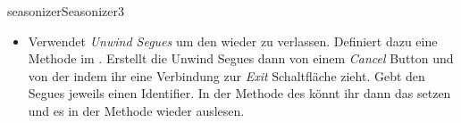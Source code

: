 \documentclass[parskip=half, final]{scrreprt}
\begin{document}
\begin{lecture}
\begin{exc}
\begin{excitem}{seasonizer}{Seasonizer}{3}
\begin{itemize}

\item Verwendet \emph{Unwind Segues} um den  wieder zu verlassen. Definiert dazu eine  Methode im . Erstellt die Unwind Segues dann von einem \emph{Cancel} Button und von der  indem ihr eine Verbindung zur \emph{Exit} Schaltfläche zieht. Gebt den Segues jeweils einen Identifier. In der  Methode des  könnt ihr dann das  setzen und es in der  Methode wieder auslesen.

\end{itemize}


\end{excitem}


\end{exc}
\end{lecture}
\end{document}
